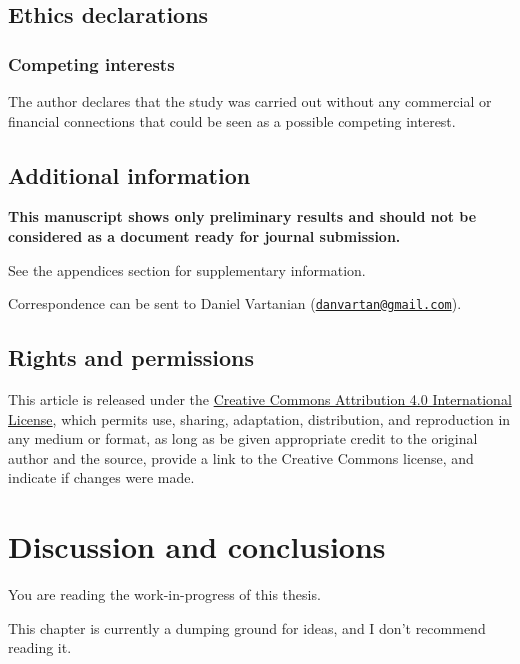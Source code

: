 \documentclass[
12pt,
openright,
oneside,
a4paper,
chapter=TITLE,
section=TITLE,
french,
spanish,
brazil,
english
]{abntex2}\usepackage{array}
\newcommand{\microskip}{\vspace{\microskipamount}}
\begin{document}
\section{Ethics declarations}\label{ethics-declarations}

\subsection{Competing interests}\label{competing-interests}

The author declares that the study was carried out without any
commercial or financial connections that could be seen as a possible
competing interest.

\section{Additional information}\label{additional-information}

\textbf{This manuscript shows only preliminary results and should not be
considered as a document ready for journal submission.}

See the appendices section for supplementary information.

Correspondence can be sent to Daniel Vartanian
(\href{mailto:danvartan@gmail.com}{\nolinkurl{danvartan@gmail.com}}).

\section{Rights and permissions}\label{rights-and-permissions}

This article is released under the
\href{http://creativecommons.org/licenses/by/4.0/}{Creative Commons
Attribution 4.0 International License}, which permits use, sharing,
adaptation, distribution, and reproduction in any medium or format, as
long as be given appropriate credit to the original author and the
source, provide a link to the Creative Commons license, and indicate if
changes were made.


\chapter{Discussion and conclusions}\label{discussion-and-conclusions}

\begin{tcolorbox}[enhanced jigsaw, arc=.35mm, toprule=.15mm, opacitybacktitle=0.6, rightrule=.15mm, opacityback=0, colframe=quarto-callout-important-color-frame, titlerule=0mm, colback=white, toptitle=1mm, coltitle=black, left=2mm, colbacktitle=quarto-callout-important-color!10!white, title=\textcolor{quarto-callout-important-color}{\faExclamation}\hspace{0.5em}{Important}, bottomrule=.15mm, breakable, bottomtitle=1mm, leftrule=.75mm]

You are reading the work-in-progress of this thesis.

\microskip

This chapter is currently a dumping ground for ideas, and I don't
recommend reading it.

\end{tcolorbox}
\end{document}
